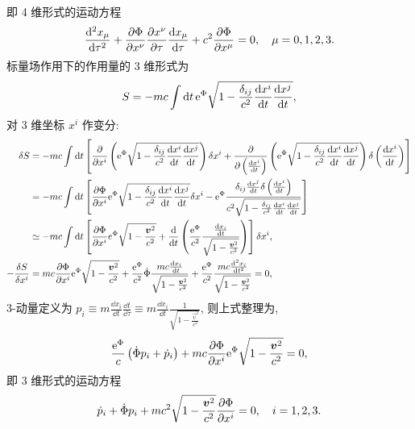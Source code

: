 \begin{solution}
\begin{align*}
    \end{align*}
    即 4 维形式的运动方程
    \[
        \frac{\dd^2 x_\mu}{\dd \tau^2} + \frac{\partial \Phi}{\partial x^\nu} \frac{\partial x^\nu}{\partial \tau} \frac{\dd x_\mu}{\dd \tau} + c^2 \frac{\partial \Phi}{\partial x^\mu} = 0, \quad \mu = 0, 1, 2, 3.
    \]
    标量场作用下的作用量的 3 维形式为
    \[
        S = - m c \int \dd t\,\mathrm e^\Phi \sqrt{1- \frac{\delta_{ij}}{c^2} \frac{\dd x^i}{\dd t} \frac{\dd x^j}{\dd t}},
    \]
    对 3 维坐标 $x^i$ 作变分:
    \begin{align*}
        \delta S &= - mc \int \dd t \left[\frac{\partial}{\partial x^i} \left(\mathrm e^\Phi \sqrt{1- \frac{\delta_{ij}}{c^2} \frac{\dd x^i}{\dd t} \frac{\dd x^j}{\dd t}}\right) \delta x^i + \frac{\partial}{\partial \left(\frac{\dd x^i}{\dd t}\right)} \left(\mathrm e^\Phi \sqrt{1- \frac{\delta_{ij}}{c^2} \frac{\dd x^i}{\dd t} \frac{\dd x^j}{\dd t}}\right) \delta \left(\frac{\dd x^i}{\dd t}\right)\right] \\
        &= - mc \int \dd t \left[\frac{\partial \Phi}{\partial x^i} \mathrm e^\Phi \sqrt{1- \frac{\delta_{ij}}{c^2} \frac{\dd x^i}{\dd t} \frac{\dd x^j}{\dd t}} \delta x^i - \mathrm e^\Phi \frac{\delta_{ij} \frac{\dd x^j}{\dd t} \delta \left(\frac{\dd x^i}{\dd t}\right)}{c^2 \sqrt{1- \frac{\delta_{ij}}{c^2} \frac{\dd x^i}{\dd t} \frac{\dd x^j}{\dd t}}}\right] \\
        & \simeq - mc \int \dd t \left[\frac{\partial \Phi}{\partial x^i} e^\Phi \sqrt{1 - \frac{\boldsymbol{v}^2}{c^2}} + \frac{\dd}{\dd t} \left(\frac{\mathrm e^\Phi}{c^2} \frac{\frac{\dd x_i}{\dd t}}{\sqrt{1 - \frac{\boldsymbol{v}^2}{c^2}}}\right)\right] \delta  x^i, \\
        - \frac{\delta S}{\delta x^i} &= m c \frac{\partial \Phi}{\partial x^i} \mathrm e^\Phi \sqrt{1 - \frac{\boldsymbol{v}^2}{c^2}} + \frac{\mathrm e^\Phi}{c^2} \dot{\Phi} \frac{mc \frac{\dd x_i}{\dd t}}{\sqrt{1 - \frac{\boldsymbol{v}^2}{c^2}}} + \frac{\mathrm e^\Phi}{c^2} \frac{mc \frac{\dd^2 x_i}{\dd t^2}}{\sqrt{1 - \frac{\boldsymbol{v}^2}{c^2}}} = 0,
    \end{align*}
    3-动量定义为 $p_i \equiv m \frac{\dd x_i}{\dd t} \frac{\dd t}{\dd \tau} \equiv m \frac{\dd x_i}{\dd t} \frac{1}{\sqrt{1 - \frac{\vec{v}^2}{c^2}}}$, 则上式整理为, 
    \[
        \frac{\mathrm e^\Phi}{c} \left(\dot{\Phi} p_i + \dot{p}_i\right) + mc \frac{\partial \Phi}{\partial x^i} \mathrm e^\Phi \sqrt{1 - \frac{\boldsymbol{v}^2}{c^2}} = 0,
    \]
    即 3 维形式的运动方程
    \[
        \dot{p}_i + \dot{\Phi} p_i + mc^2 \sqrt{1 - \frac{\boldsymbol{v}^2}{c^2}} \frac{\partial \Phi}{\partial x^i} = 0, \quad i = 1, 2, 3.
    \]
\end{solution}



